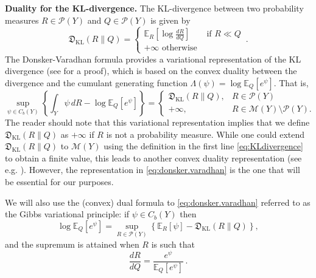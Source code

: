 \documentclass{amsart}
\theoremstyle{definition}
\theoremstyle{remark}
\numberwithin{equation}{section}
\begin{document}
\textbf{Duality for the KL-divergence.}
The KL-divergence between two probability measures $R\in \mathcal{P}(Y)$ and $Q\in \mathcal{P}(Y)$ is given by 
\begin{equation}\label{eq:KLdivergence}
\mathfrak{D}_{\textrm{KL}}(R\|Q) = 
\left\{
\begin{array}{cl}
\mathbb{E}_R\left[ \log \frac{dR}{dQ}\right] & \textrm{ if } R \ll Q \\
+\infty \textrm{ otherwise}
\end{array}
\right. \,.
\end{equation}
The Donsker-Varadhan formula provides a variational representation of the KL divergence (see \cite{dupell4} for a proof), which is based on the convex duality between the divergence and the cumulant generating function $\Lambda(\psi)=\log \mathbb{E}_Q[e^{\psi}]$. That is, 
\begin{equation}\label{eq:donsker.varadhan}
\sup_{\psi \in C_b(Y)} 
\left\{ 
\int_Y \psi \,dR- \log \mathbb{E}_Q[e^{\psi}]
\right\} =  
\left\{ 
\begin{array}{cl} 
\mathfrak{D}_{\textrm{KL}}(R\|Q),  & R \in \mathcal{P}(Y) \\
+\infty, &  R \in \mathcal{M}(Y) \setminus \mathcal{P}(Y).
\end{array}
\right. 
\end{equation}
The reader should note that this variational representation implies that we define $\mathfrak{D}_{\textrm{KL}}(R\|Q)$ as $+\infty$ if $R$ is not a probability measure. 
While one could extend  $\mathfrak{D}_{\textrm{KL}}(R\|Q)$ 
to $\mathcal{M}(Y)$ using the definition in the first line \eqref{eq:KLdivergence} to obtain a finite value,  this leads to another convex duality representation (see e.g. \cite{birrell2022f}). However, the representation in \eqref{eq:donsker.varadhan} is the one that will be essential for our purposes. 

We will also use the (convex) dual formula to \eqref{eq:donsker.varadhan} referred to as the Gibbs variational principle:  if $\psi \in C_b(Y)$
then 
\begin{equation}\label{eq:gibbs}
\log \mathbb{E}_Q[e^{\psi}] = \sup_{R \in \mathcal{P}(Y)} 
\left\{ \mathbb{E}_R[\psi] - \mathfrak{D}_{\textrm{KL}}(R\|Q)\right\} ,
\end{equation}
and the supremum is attained when $R$ is such that 
\begin{equation}
\frac{dR}{dQ} = \frac{e^{\psi}}{\mathbb{E}_Q[e^{\psi}]}\,.
\end{equation}
\end{document}
